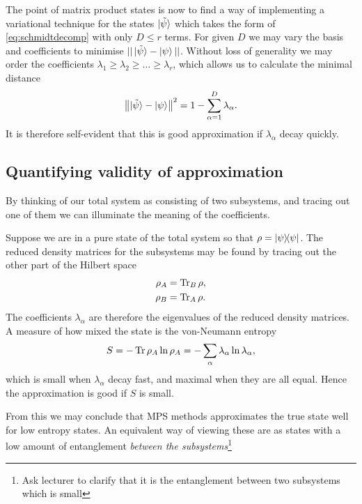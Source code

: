\documentclass[a4paper]{article}
\begin{document}
The point of matrix product states is now to find a way of implementing
a variational technique for the  states $\ket{\tilde{\psi}}$
which takes the form of \eqref{eq:schmidtdecomp} with only $D\leq r$ terms. For
given $D$ we may vary the basis and coefficients to minimise
$||\ket{\tilde{\psi}}-\ket{\psi}||$.
Without loss of generality we may order the coefficients $\lambda_1\geq
\lambda_2\geq\dots \geq \lambda_r$, which allows us to calculate the minimal
distance
\[ 
\left\lVert\ket{\tilde{\psi}}-\ket{\psi}\right\rVert^2=1-\sum_{\alpha=1}^D \lambda_\alpha.
\]
It is therefore self-evident that this is good approximation if $\lambda_\alpha$ decay quickly.

\subsection{Quantifying validity of approximation}
By thinking of our total system as consisting of two subsystems, and tracing out
one of them we can illuminate the meaning of the coefficients.
\begin{center}
\end{center}
Suppose we are in a pure state of the total system so that
$\rho=\ket{\psi}\!\!\bra{\psi}$. The reduced density matrices for the subsystems may
be found by tracing out the other part of the Hilbert space 
\begin{align*}
\rho_A&=\operatorname{Tr}_B \rho,\\
\rho_B&=\operatorname{Tr}_A \rho.
\end{align*}
The coefficients $\lambda_\alpha$ are therefore the eigenvalues of the reduced density matrices.
A measure of how mixed the state is the von-Neumann entropy
\[S= - \operatorname{Tr} \rho_A\ln \rho_A=-\sum_\alpha \lambda_\alpha \ln \lambda_\alpha,\]
which is small when $\lambda_\alpha$ decay fast, and maximal when they are all
equal. Hence the approximation is good if $S$ is small.
\begin{remark}
From this we may conclude that MPS methods approximates the true state well for
low entropy states. An equivalent way of viewing these are as states with a low
amount of entanglement \emph{between the subsystems}\footnote{Ask lecturer to
clarify that it is the entanglement between two subsystems which is small}
\end{remark}
\end{document}
